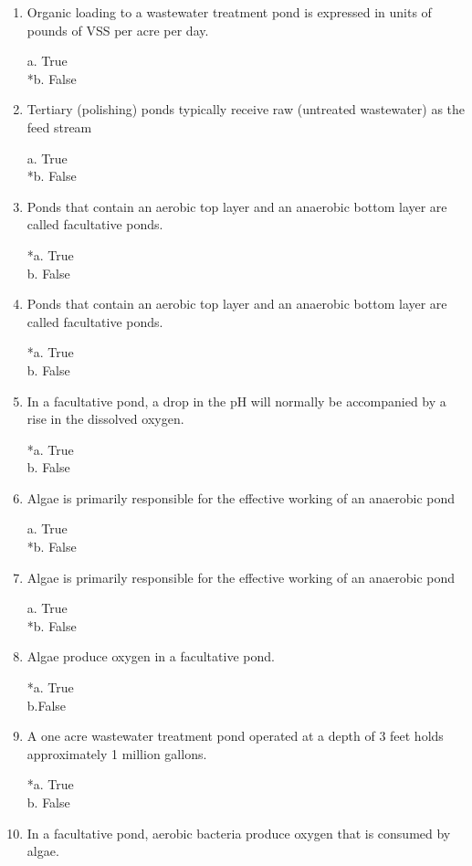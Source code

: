 \begin{enumerate}
\item  Organic loading to a wastewater treatment pond is expressed in units of pounds of VSS per acre per day. 

a. True \\
*b. False 


\item  Tertiary (polishing) ponds typically receive raw (untreated wastewater) as the feed stream 

a. True \\
*b. False 


\item  Ponds that contain an aerobic top layer and an anaerobic bottom layer are called facultative ponds. 

*a. True \\
b. False 


\item  Ponds that contain an aerobic top layer and an anaerobic bottom layer are called facultative ponds. 

*a. True \\
b. False 


\item  In a facultative pond, a drop in the pH will normally be accompanied by a rise in the dissolved oxygen. 

*a. True \\
b. False 


\item  Algae is primarily responsible for the effective working of an anaerobic pond 

a. True \\
*b. False 


\item  Algae is primarily responsible for the effective working of an anaerobic pond 

a. True \\
*b. False 


\item  Algae produce oxygen in a facultative pond. 

*a. True\\
b.False 


\item  A one acre wastewater treatment pond operated at a depth of 3 feet holds approximately 1 million gallons. 

*a. True \\
b. False 


\item  In a facultative pond, aerobic bacteria produce oxygen that is consumed by algae. 


\end{enumerate}
